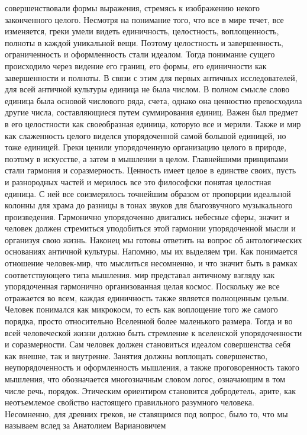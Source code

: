 совершенствовали формы выражения, стремясь к изображению некого законченного
целого. Несмотря на понимание того, что все в мире течет, все изменяется, греки
умели видеть единичность, целостность, воплощенность, полноты в каждой
уникальной вещи. Поэтому целостность и завершенность, ограниченность и
оформленность стали идеалом. Тогда понимание сущего происходило через видение
его границ, его формы, его единичности как завершенности и полноты. В связи с
этим для первых античных исследователей, для всей античной культуры единица не
была числом. В полном смысле слово единица была основой числового ряда, счета,
однако она ценностно превосходила другие числа, составляющиеся путем
суммирования единиц. Важен был предмет в его целостности как своеобразная
единица, которую все и мерили. Также и мир как слаженность целого виделся
упорядоченной самой большой единицей, но тоже единицей. Греки ценили
упорядоченную организацию целого в природе, поэтому в искусстве, а затем в
мышлении в целом. Главнейшими принципами стали гармония и соразмерность.
Ценность имеет целое в единстве своих, пусть и разнородных частей и мерилось все
это философски понятая целостная единица. С ней все соизмерялось точнейшим
образом от пропорции идеальной колонны для храма до разницы в тонах звуков для
благозвучного музыкального произведения. Гармонично упорядоченно двигались
небесные сферы, значит и человек должен стремиться уподобиться этой гармонии
упорядоченной мысли и организуя свою жизнь. Наконец мы готовы ответить на вопрос
об антологических основаниях античной культуры. Напомню, мы их выделяем три. Как
понимается отношение человек-мир, что мыслиться несомненно, и что значит быть в
рамках соответствующего типа мышления. мир представал античному взгляду как
упорядоченная гармонично организованная целая космос. Поскольку же все
отражается во всем, каждая единичность также является полноценным целым. Человек
понимался как микрокосм, то есть как воплощение того же самого порядка, просто
относительно Вселенной более маленького размера. Тогда и во всей человеческой
жизни должно быть стремление к вселенской упорядоченности и соразмерности. Сам
человек должен становиться идеалом совершенства себя как внешне, так и
внутренне. Занятия должны воплощать совершенство, неупорядоченность и
оформленность мышления, а также проговоренность такого мышления, что
обозначается многозначным словом логос, означающим в том числе речь, порядок.
Этическим ориентиром становится добродетель, арите, как неотъемлемое свойство
настоящего правильного разумного человека. Несомненно, для древних греков, не
ставящимся под вопрос, было то, что мы называем вслед за Анатолием Вариановичем
